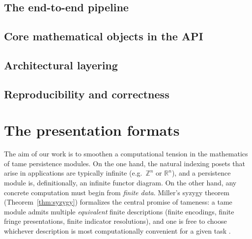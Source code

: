 \documentclass{article}
\newcommand{\<}{\langle}
\renewcommand{\>}{\rangle}
\theoremstyle{definition}
\theoremstyle{remark}
\begin{document}
	
	
	\subsection{The end-to-end pipeline}
	
	\subsection{Core mathematical objects in the API}
	
	\subsection{Architectural layering}
	
	\subsection{Reproducibility and correctness}
	
	\section{The presentation formats}\label{sec:presentation-formats}
	
	The aim of our work is to smoothen a computational tension in the
	mathematics of tame persistence modules.  On the one hand, the natural indexing posets
	that arise in applications are typically infinite (e.g.\ $\mathbb{Z}^n$ or $\mathbb{R}^n$),
	and a persistence module is, definitionally, an infinite functor diagram.  On the other hand,
	any concrete computation must begin from \emph{finite data}.  Miller's syzygy theorem
	(Theorem~\ref{thm:syzygy}) formalizes the central promise of tameness: a tame module admits
	multiple \emph{equivalent} finite descriptions (finite encodings, finite fringe presentations,
	finite indicator resolutions), and one is free to choose whichever description is most
	computationally convenient for a given task \cite{Mil20}.
	
\end{document}
